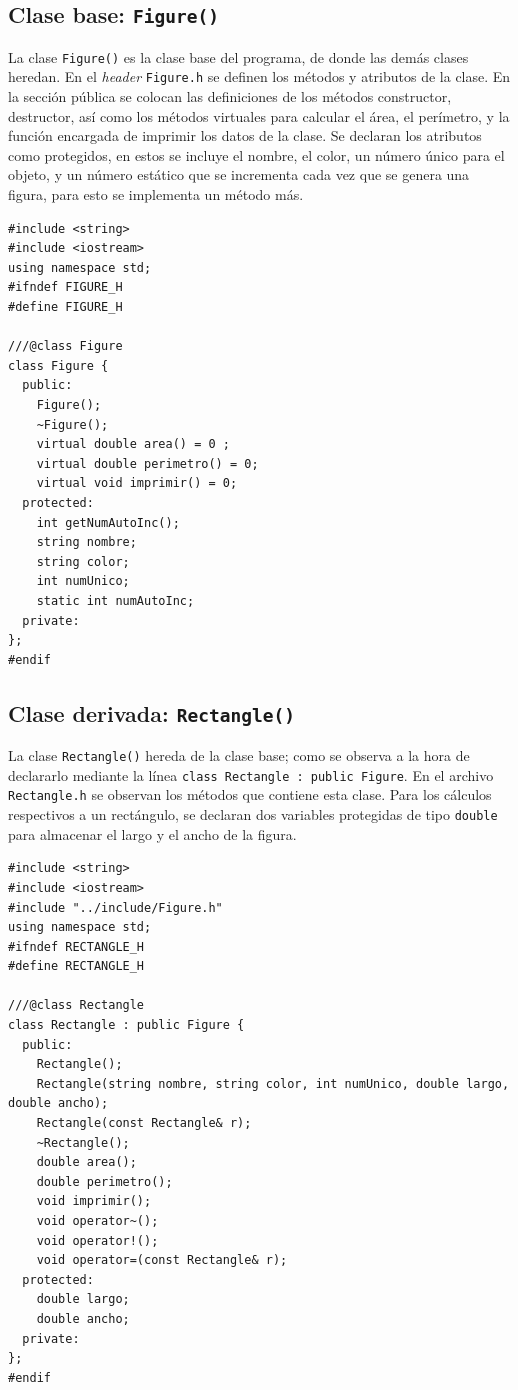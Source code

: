 \subsection{Clase base: \texttt{Figure()}}
La clase \texttt{Figure()} es la clase base del programa, de donde las demás clases heredan. En el \textit{header} \texttt{Figure.h} se definen los métodos y atributos de la clase. En la sección pública se colocan las definiciones de los métodos constructor, destructor, así como los métodos virtuales para calcular el área, el perímetro, y la función encargada de imprimir los datos de la clase. Se declaran los atributos como protegidos, en estos se incluye el nombre, el color, un número único para el objeto, y un número estático que se incrementa cada vez que se genera una figura, para esto se implementa un método más.

\begin{verbatim}
#include <string>
#include <iostream>
using namespace std;
#ifndef FIGURE_H
#define FIGURE_H

///@class Figure
class Figure {
  public:
    Figure();
    ~Figure();
    virtual double area() = 0 ; 
    virtual double perimetro() = 0; 
    virtual void imprimir() = 0;
  protected:
    int getNumAutoInc();
    string nombre;
    string color;
    int numUnico;
    static int numAutoInc; 
  private:
};
#endif
\end{verbatim}

\subsection{Clase derivada: \texttt{Rectangle()}}

La clase \texttt{Rectangle()} hereda de la clase base; como se observa a la hora de declararlo mediante la línea \texttt{class Rectangle : public Figure}. En el archivo \texttt{Rectangle.h} se observan los métodos que contiene esta clase. Para los cálculos respectivos a un rectángulo, se declaran dos variables protegidas de tipo \texttt{double} para almacenar el largo y el ancho de la figura.
\begin{verbatim}
#include <string>
#include <iostream>
#include "../include/Figure.h"
using namespace std;
#ifndef RECTANGLE_H
#define RECTANGLE_H

///@class Rectangle
class Rectangle : public Figure {
  public:
    Rectangle();
    Rectangle(string nombre, string color, int numUnico, double largo, double ancho);
    Rectangle(const Rectangle& r);
    ~Rectangle();
    double area();
    double perimetro();
    void imprimir();
    void operator~();
    void operator!();
    void operator=(const Rectangle& r);
  protected:
    double largo;
    double ancho;
  private:
};
#endif
\end{verbatim}

